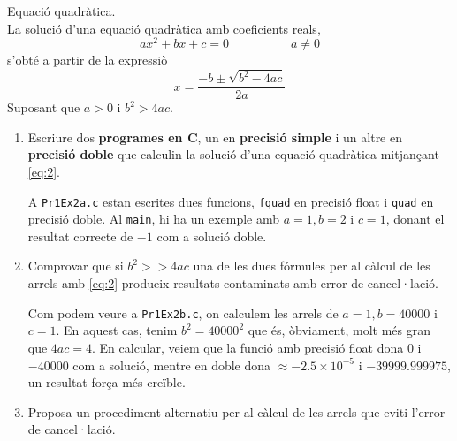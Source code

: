 \documentclass[a4paper, 12pt]{article}
\begin{document}
    \begin{exercici}
        Equació quadràtica.\\
        La solució d'una equació quadràtica amb coeficients reals,
        \begin{displaymath}
            ax^2+bx+c=0 \hspace{5em} a \neq 0
        \end{displaymath}
        s'obté a partir de la expressiò
        \begin{equation}
            x = \frac{-b\pm\sqrt{b^2-4ac}}{2a}
            \label{eq:2}
        \end{equation}
        Suposant que $a > 0$ i $b^2 > 4ac$.
        \begin{enumerate}[label=\alph*)]
            \item Escriure dos \textbf{programes en C}, un en \textbf{precisió simple} i un altre en
            \textbf{precisió doble} que calculin la solució d'una equació quadràtica mitjançant \eqref{eq:2}.\\
            \begin{solucio}
                A \verb|Pr1Ex2a.c| estan escrites dues funcions, \verb|fquad| en precisió float i \verb|quad|
                en precisió doble. Al \verb|main|, hi ha un exemple amb $a=1, b=2$ i $c=1$, donant
                el resultat correcte de $-1$ com a solució doble. 
            \end{solucio}
            \item Comprovar que si $b^2 >> 4ac$ una de les dues fórmules per al càlcul de les arrels
            amb \eqref{eq:2} produeix resultats contaminats amb error de cancel·lació.\\
            \begin{solucio}
                Com podem veure a \verb|Pr1Ex2b.c|, on calculem les arrels de $a=1, b=40000$ i $c=1$.
                En aquest cas, tenim $b^2 = 40000^2$ que és, òbviament, molt més gran que $4ac = 4$.
                En calcular, veiem que la funció amb precisió float dona $0$ i $-40000$ com a
                solució, mentre en doble dona $\approx-2.5\times10^{-5}$ i $ -39999.999975$, un
                resultat força més creïble. 
            \end{solucio}
            \item Proposa un procediment alternatiu per al càlcul de les arrels que eviti l'error de
            cancel·lació.\\
            \begin{solucio}

\end{solucio}
\end{enumerate}
\end{exercici}
\end{document}
